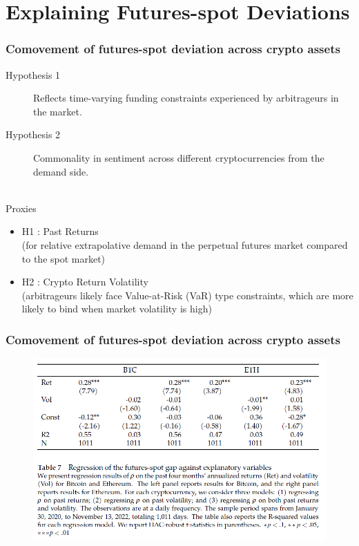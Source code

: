 \documentclass{beamer}
\begin{document}
\section{Explaining Futures-spot Deviations}

\begin{frame}
\frametitle{Comovement of futures-spot deviation across crypto assets}
\begin{description}
    \item[Hypothesis 1] Reflects \alert{time-varying funding constraints} experienced by arbitrageurs in the market.
    \item[Hypothesis 2] \alert{Commonality in sentiment} across different cryptocurrencies from the demand side.
\end{description}
~\\Proxies
\begin{itemize}
    \item H1 : Past Returns \\(for relative extrapolative demand in the perpetual futures market compared to the spot market)
    \item H2 : Crypto Return Volatility \\(arbitrageurs likely face Value-at-Risk (VaR) type constraints, which are more likely to bind when market volatility is high)
\end{itemize}
\end{frame}

\begin{frame}
\frametitle{Comovement of futures-spot deviation across crypto assets}
\begin{figure}
    \includegraphics[width=0.8\linewidth]{figs/Table7.png}
\end{figure}
\end{frame}
\end{document}

